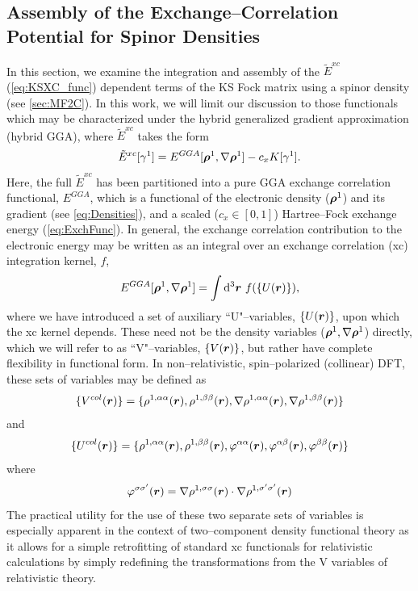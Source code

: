 \subsection{Assembly of the Exchange--Correlation Potential for Spinor Densities}

In this section, we examine the integration and assembly of the $\tilde E^{xc}$ (\cref{eq:KSXC_func})
dependent terms of the KS Fock matrix using a spinor density (see
\cref{sec:MF2C}).  In this work, we will limit our discussion to those
functionals which may be characterized under the hybrid generalized gradient
approximation (hybrid GGA), where $\tilde E^{xc}$ takes the form
\begin{equation}
  \label{eq:XCFUN}
\tilde E^{xc}[\gamma^1] = E^{GGA}[\boldsymbol{\rho}^1,\nabla\boldsymbol{\rho}^1] - c_{x}K[\gamma^1] .
\end{equation}
Here, the full $\tilde E^{xc}$ has been partitioned into a pure GGA exchange correlation functional, $E^{GGA}$, 
which is a functional of the electronic density ($\boldsymbol{\rho}^1$) and its gradient (see \cref{eq:Densities}),
and a scaled ($c_x \in [0,1]$) Hartree--Fock exchange energy (\cref{eq:ExchFunc}).
In general, the exchange correlation contribution to the
electronic energy may be written as an integral over an exchange correlation (xc) integration kernel, $f$,
\begin{equation}
  \label{eq:EXCEVAL}
E^{GGA}[\boldsymbol{\rho}^1, \nabla \boldsymbol{\rho}^1] = \int \mathrm{d}^3 \boldsymbol{r} \text{  }f(\{ U(\boldsymbol{r}) \}) ,
\end{equation}
where we have introduced a set of auxiliary ``U"--variables, $\{U(\boldsymbol{r})\}$, upon which
the xc kernel depends. These need not be the density variables ($\boldsymbol{\rho}^1, \nabla \boldsymbol{\rho}^1$) directly,
which we will refer to as ``V"--variables, $\{V(\boldsymbol{r})\}$, but rather have complete flexibility in
functional form. In non--relativistic, spin--polarized (collinear) DFT, these sets of variables
may be defined as
\begin{equation}
  \label{eq:Vcol}
  \{ V^{col}(\boldsymbol{r}) \} = \{ \rho^{1,{\alpha\alpha}}(\boldsymbol{r}), \rho^{1,{\beta\beta}}(\boldsymbol{r}), \nabla \rho^{1,{\alpha\alpha}}(\boldsymbol{r}), \nabla \rho^{1,{\beta\beta}}(\boldsymbol{r}) \} 
\end{equation}
and
\begin{equation}
  \label{eq:Ucol}
  \{ U^{col}(\boldsymbol{r}) \} = \{ \rho^{1,{\alpha\alpha}}(\boldsymbol{r}), \rho^{1,{\beta\beta}}(\boldsymbol{r}), \varphi^{\alpha\alpha}(\boldsymbol{r}), \varphi^{\alpha\beta}(\boldsymbol{r}), \varphi^{\beta\beta}(\boldsymbol{r}) \}
\end{equation}
where
\begin{equation}
  \varphi^{\sigma\sigma'}(\boldsymbol{r}) = \nabla \rho^{1,\sigma\sigma}(\boldsymbol{r}) \cdot \nabla \rho^{1,\sigma'\sigma'}(\boldsymbol{r})
\end{equation}
The practical utility for the use of these two separate sets of variables 
is especially apparent in the context of two--component density functional theory
as it allows for a simple retrofitting of standard xc functionals for relativistic calculations
by simply redefining the transformations from the V variables of relativistic theory. 

